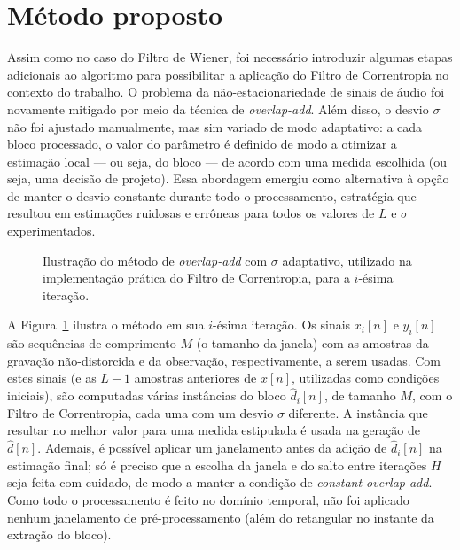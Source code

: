 \section{Método proposto}

Assim como no caso do Filtro de Wiener, foi necessário introduzir algumas etapas adicionais ao algoritmo para possibilitar a aplicação do Filtro de Correntropia no contexto do trabalho. O problema da não-estacionariedade de sinais de áudio foi novamente mitigado por meio da técnica de \textit{overlap-add}. Além disso, o desvio $\sigma$ não foi ajustado manualmente, mas sim variado de modo adaptativo: a cada bloco processado, o valor do parâmetro 
é definido de modo a otimizar a estimação local --- ou seja, do bloco --- de acordo com uma medida escolhida (ou seja, uma decisão de projeto). Essa abordagem emergiu como alternativa à opção de manter o desvio constante durante todo o processamento, estratégia que resultou em estimações ruidosas e errôneas para todos os valores de $L$ e $\sigma$ experimentados.

\begin{figure}[!ht]
    \centering
    
    \caption[Ilustração do método utilizado para o Filtro de Correntropia]{Ilustração do método de \textit{overlap-add} com $\sigma$ adaptativo, utilizado na implementação prática do Filtro de Correntropia, para a $i$-ésima iteração.}
    \label{fig:correntropy:method}
\end{figure}

A Figura~\ref{fig:correntropy:method} ilustra o método em sua $i$-ésima iteração. Os sinais $x_i[n]$ e $y_i[n]$ são sequências de comprimento $M$ (o tamanho da janela) com as amostras da gravação não-distorcida e da observação, respectivamente, a serem usadas. Com estes sinais (e as $L - 1$ amostras anteriores de $x[n]$, utilizadas como condições iniciais), são computadas várias instâncias do bloco $\hat{d}_i[n]$, de tamanho $M$, com o Filtro de Correntropia, cada uma com um desvio $\sigma$ diferente. A instância que resultar no melhor valor para uma medida estipulada é usada na geração de $\hat{d}[n]$. Ademais, é possível aplicar um janelamento antes da adição de $\hat{d}_i[n]$ na estimação final; só é preciso que a escolha da janela e do salto entre iterações $H$ seja feita com cuidado, de modo a manter a condição de \textit{constant overlap-add}. Como todo o processamento é feito no domínio temporal, não foi aplicado nenhum janelamento de pré-processamento (além do retangular no instante da extração do bloco).

